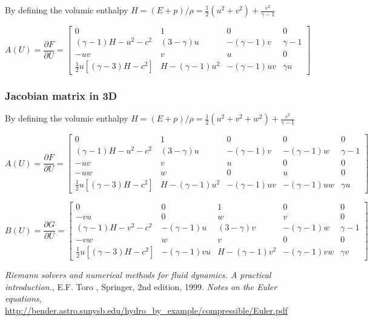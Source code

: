 \documentclass{article}
\begin{document}
By defining the volumic enthalpy $H=(E+p)/\rho = \frac{1}{2}(u^2+v^2)+\frac{c^2}{\gamma-1}$

\begin{equation}
  A(U) = \frac{\partial F}{\partial U} = \left[
    \begin{array}{cccc}
      0 & 1 & 0 & 0\\
      (\gamma-1)H- u^2-c^2 & (3-\gamma) u & -(\gamma-1)v & \gamma-1\\
      -u v & v & u & 0\\
      \frac{1}{2} u [(\gamma-3)H-c^2] & H-(\gamma-1)u^2 & -(\gamma-1)uv &\gamma u
    \end{array}
  \right]
\end{equation}

\subsubsection*{Jacobian matrix in 3D}

By defining the volumic enthalpy $H=(E+p)/\rho = \frac{1}{2}(u^2+v^2+w^2)+\frac{c^2}{\gamma-1}$

\begin{equation}
  A(U) = \frac{\partial F}{\partial U} = \left[
    \begin{array}{ccccc}
      0 & 1 & 0 & 0 & 0\\
      (\gamma-1)H- u^2-c^2 & (3-\gamma) u & -(\gamma-1)v & -(\gamma-1)w & \gamma-1\\
      -u v & v & u & 0 & 0\\
      -u w & w & 0 & u & 0\\
      \frac{1}{2} u [(\gamma-3)H-c^2] & H-(\gamma-1)u^2 & -(\gamma-1)uv &-(\gamma-1)uw & \gamma u
    \end{array}
  \right]
\end{equation}

\begin{equation}
  B(U) = \frac{\partial G}{\partial U} = \left[
    \begin{array}{ccccc}
      0 & 0 & 1 & 0 & 0\\
      -v u & 0 & w & v & 0\\
      (\gamma-1)H- v^2-c^2 & -(\gamma-1)u & (3-\gamma) v & -(\gamma-1)w &  \gamma-1\\
      -v w & w & v & 0 & 0\\
      \frac{1}{2} u [(\gamma-3)H-c^2] & -(\gamma-1)vu & H-(\gamma-1)v^2 & -(\gamma-1)vw & \gamma v
    \end{array}
  \right]
\end{equation}


\begin{thebibliography}{9}
 \emph{Riemann solvers and numerical methods for fluid dynamics. A practical introduction.}, E.F. Toro , Springer, 2nd edition, 1999.
 \emph{Notes on the Euler equations}, \url{http://bender.astro.sunysb.edu/hydro_by_example/compressible/Euler.pdf}
\end{thebibliography}
\end{document}
